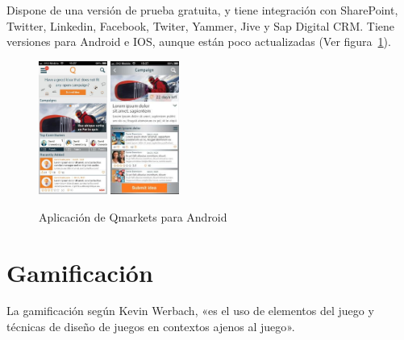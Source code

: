  Dispone de una versión de prueba gratuita, y tiene integración con SharePoint, Twitter, Linkedin, Facebook, Twiter, Yammer, Jive y Sap Digital CRM. Tiene versiones para Android e IOS, aunque están poco actualizadas (Ver figura~\ref{fig:qmarkets}).
 
 \begin{figure}[!h]
 	\begin{center}
 		\includegraphics[width=0.2\textwidth]{./img/competencia/qmarkets/1.jpg}
 		\includegraphics[width=0.2\textwidth]{./img/competencia/qmarkets/2.jpg}
 		\caption{Aplicación de Qmarkets para Android}
 		\label{fig:qmarkets}
 	\end{center}
 \end{figure}

\section{Gamificación}

La gamificación según Kevin Werbach, «es el uso de elementos del juego y técnicas de diseño de juegos en contextos ajenos al juego».


